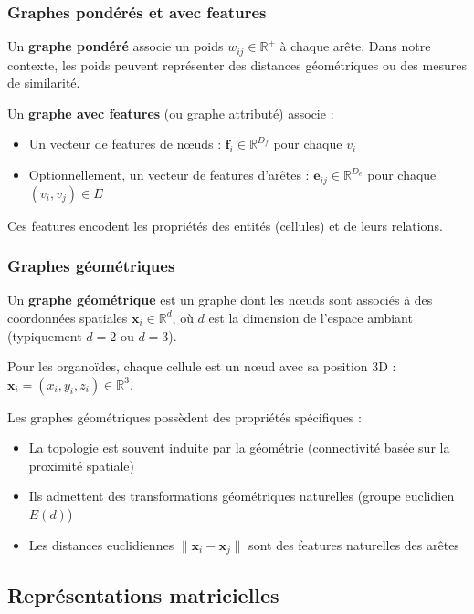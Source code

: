 \subsubsection{Graphes pondérés et avec features}

Un \textbf{graphe pondéré} associe un poids $w_{ij} \in \mathbb{R}^+$ à chaque arête. Dans notre contexte, les poids peuvent représenter des distances géométriques ou des mesures de similarité.

Un \textbf{graphe avec features} (ou graphe attributé) associe :
\begin{itemize}
    \item Un vecteur de features de nœuds : $\mathbf{f}_i \in \mathbb{R}^{D_f}$ pour chaque $v_i$
    \item Optionnellement, un vecteur de features d'arêtes : $\mathbf{e}_{ij} \in \mathbb{R}^{D_e}$ pour chaque $(v_i, v_j) \in E$
\end{itemize}

Ces features encodent les propriétés des entités (cellules) et de leurs relations.

\subsubsection{Graphes géométriques}

Un \textbf{graphe géométrique} est un graphe dont les nœuds sont associés à des coordonnées spatiales $\mathbf{x}_i \in \mathbb{R}^d$, où $d$ est la dimension de l'espace ambiant (typiquement $d = 2$ ou $d = 3$).

Pour les organoïdes, chaque cellule est un nœud avec sa position 3D : $\mathbf{x}_i = (x_i, y_i, z_i) \in \mathbb{R}^3$.

Les graphes géométriques possèdent des propriétés spécifiques :
\begin{itemize}
    \item La topologie est souvent induite par la géométrie (connectivité basée sur la proximité spatiale)
    \item Ils admettent des transformations géométriques naturelles (groupe euclidien $E(d)$)
    \item Les distances euclidiennes $\|\mathbf{x}_i - \mathbf{x}_j\|$ sont des features naturelles des arêtes
\end{itemize}

\subsection{Représentations matricielles}

